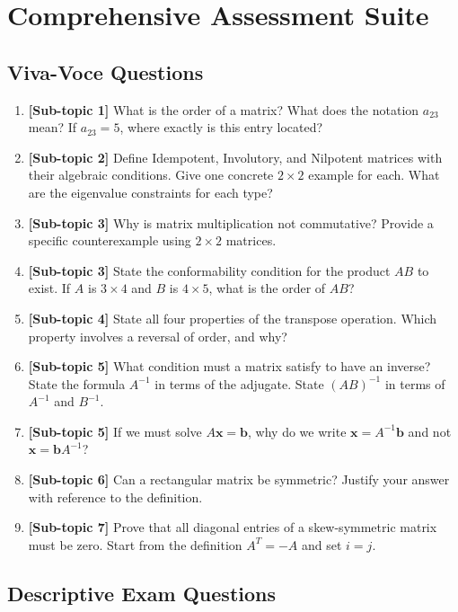 \documentclass[12pt,a4paper]{article}
\begin{document}
\section{Comprehensive Assessment Suite}

\subsection*{Viva-Voce Questions}

\begin{enumerate}
  \item \textbf{[Sub-topic 1]} What is the order of a matrix? What does the notation $a_{23}$ mean? If $a_{23} = 5$, where exactly is this entry located?
  \item \textbf{[Sub-topic 2]} Define Idempotent, Involutory, and Nilpotent matrices with their algebraic conditions. Give one concrete $2\times2$ example for each. What are the eigenvalue constraints for each type?
  \item \textbf{[Sub-topic 3]} Why is matrix multiplication not commutative? Provide a specific counterexample using $2 \times 2$ matrices.
  \item \textbf{[Sub-topic 3]} State the conformability condition for the product $AB$ to exist. If $A$ is $3 \times 4$ and $B$ is $4 \times 5$, what is the order of $AB$?
  \item \textbf{[Sub-topic 4]} State all four properties of the transpose operation. Which property involves a reversal of order, and why?
  \item \textbf{[Sub-topic 5]} What condition must a matrix satisfy to have an inverse? State the formula $A^{-1}$ in terms of the adjugate. State $(AB)^{-1}$ in terms of $A^{-1}$ and $B^{-1}$.
  \item \textbf{[Sub-topic 5]} If we must solve $A\mathbf{x} = \mathbf{b}$, why do we write $\mathbf{x} = A^{-1}\mathbf{b}$ and not $\mathbf{x} = \mathbf{b} A^{-1}$?
  \item \textbf{[Sub-topic 6]} Can a rectangular matrix be symmetric? Justify your answer with reference to the definition.
  \item \textbf{[Sub-topic 7]} Prove that all diagonal entries of a skew-symmetric matrix must be zero. Start from the definition $A^T = -A$ and set $i = j$.
\end{enumerate}

\subsection*{Descriptive Exam Questions}
\end{document}
